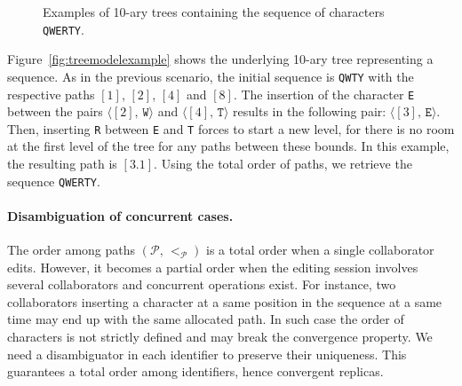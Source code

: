 \begin{figure*}
  \centering
  \hspace{20pt}
  \caption{Examples of 10-ary trees containing the sequence of characters
    \texttt{QWERTY}.}
\end{figure*}

Figure~\ref{fig:treemodelexample} shows the underlying 10-ary tree representing
a sequence. As in the previous scenario, the initial sequence is \texttt{QWTY}
with the respective paths $[1]$, $[2]$, $[4]$ and $[8]$. The insertion of the
character \texttt{E} between the pairs $\langle [2],\, \texttt{W}\rangle$ and
$\langle [4],\, \texttt{T}\rangle$ results in the following pair:
$\langle [3],\, \texttt{E} \rangle$. Then, inserting \texttt{R} between
\texttt{E} and \texttt{T} forces to start a new level, for there is no room at
the first level of the tree for any paths between these bounds. In this example,
the resulting path is $[3.1]$. Using the total order of paths, we retrieve the
sequence \texttt{QWERTY}.



\paragraph{Disambiguation of concurrent cases.}
The order among paths $(\mathcal{P},\,<_\mathcal{P})$ is a total order when a
single collaborator edits. However, it becomes a partial order when the editing
session involves several collaborators and concurrent operations exist. For
instance, two collaborators inserting a character at a same position in the
sequence at a same time may end up with the same allocated path. In such case
the order of characters is not strictly defined and may break the convergence
property. We need a disambiguator in each identifier to preserve their
uniqueness. This guarantees a total order among identifiers, hence convergent
replicas.

